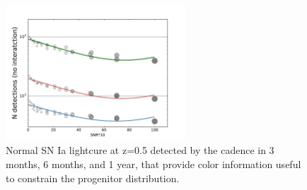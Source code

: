 \begin{figure}[hbt]
  \centerline{
    \includegraphics[width=0.6\textwidth]{figs/transients/LSST_Iadetected_wcolor.pdf}
  }
  \caption{
    Normal SN Ia lightcure at z=0.5 detected by the  cadence in 3 months, 6 months, and 1 year, that provide color information useful to constrain the progenitor distribution. }
  \label{fig:sndetect}
\end{figure}

